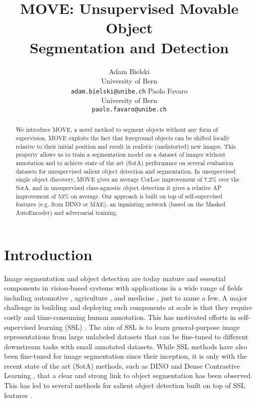 \documentclass{article}
\title{MOVE: Unsupervised Movable Object \\
Segmentation and Detection}
\author{
    Adam Bielski \\
    University of Bern \\
    \texttt{adam.bielski@unibe.ch}
    \And
    Paolo Favaro \\
    University of Bern \\
    \texttt{paolo.favaro@unibe.ch}
}
\begin{document}
\maketitle


\begin{abstract}

We introduce MOVE, a novel method to segment objects without any form of supervision.
MOVE exploits the fact that foreground objects can be shifted locally relative to their initial position and result in realistic (undistorted) new images. This property allows us to train a segmentation model on a dataset of images without annotation and to achieve state of the art (SotA) performance on several evaluation datasets for unsupervised salient object detection and segmentation. In unsupervised single object discovery, MOVE gives an average CorLoc improvement of 7.2\% over the SotA, and in unsupervised class-agnostic object detection it gives a relative AP improvement of 53\% on average.
Our approach is built on top of self-supervised features (e.g. from DINO or MAE), an inpainting network (based on the Masked AutoEncoder) and adversarial training.
\end{abstract}


\section{Introduction}

Image segmentation and object detection are today mature and essential components in vision-based systems with applications in a wide range of fields including automotive \cite{chen2015deepdriving}, agriculture \cite{Chiu_2020_CVPR}, and medicine \cite{smistad2015medical}, just to name a few.
A major challenge in building and deploying such components at scale is that they require costly and time-consuming human annotation. This has motivated efforts in self-supervised learning (SSL) \cite{caron2021emerging,chen2021mocov3,wang2021dense}. The aim of SSL is to learn general-purpose image representations from large unlabeled datasets that can be fine-tuned to different downstream tasks with small annotated datasets. While SSL methods have also been fine-tuned for image segmentation since their inception, it is only with the recent state of the art (SotA) methods, such as DINO \cite{caron2021emerging} and Dense Contrastive Learning \cite{wang2021dense}, that a clear and strong link to object segmentation has been observed. This has led to several methods for salient object detection built on top of SSL features \cite{amir2021deep,wang2022freesolo,yin2021transfgu,LOST,wang2022self,Shin2022selfmask}. 
\end{document}
